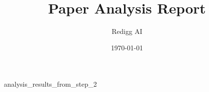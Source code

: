 \documentclass[12pt,a4paper]{article}
\title{Paper Analysis Report}
\author{Redigg AI}
\date{\today}
\begin{document}
\maketitle

analysis\_results\_from\_step\_2
\end{document}
